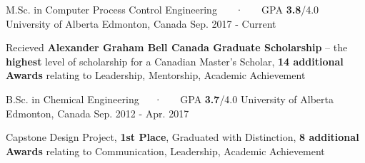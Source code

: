 

\begin{cventries}

  \cventry
    {M.Sc. in Computer Process Control Engineering ~~~·~~~ GPA \textbf{3.8}/4.0} %
    {University of Alberta} %
    {Edmonton, Canada} %
    {Sep. 2017 - Current} %
    {
      \begin{cvitems} %
        \item {Recieved \textbf{Alexander Graham Bell Canada Graduate Scholarship} – the \textbf{highest} level of scholarship for a Canadian Master's Scholar, \textbf{14 additional Awards} relating to Leadership, Mentorship, Academic Achievement }
      \end{cvitems}
    }

\cventry
{B.Sc. in Chemical Engineering~~~·~~~ GPA \textbf{3.7}/4.0} %
{University of Alberta} %
{Edmonton, Canada} %
{Sep. 2012 - Apr. 2017} %
{
	\begin{cvitems} %
		\item {Capstone Design Project, \textbf{1st Place}, Graduated with Distinction, \textbf{8 additional Awards} relating to Communication, Leadership, Academic Achievement}
	\end{cvitems}
}

\end{cventries}
